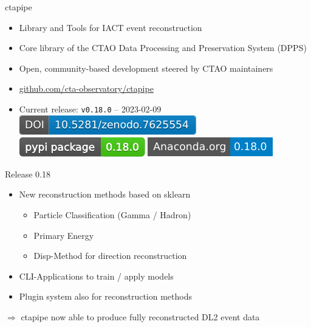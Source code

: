 \documentclass[aspectratio=1610, 9pt]{beamer}
\begin{document}
\begin{frame}{ctapipe}
  \begin{itemize}
    \item Library and Tools for IACT event reconstruction
    \item Core library of the CTAO Data Processing and Preservation System (DPPS)
    \item Open, community-based development steered by CTAO maintainers
    \item \href{https://github.com/cta-observatory/ctapipe}{github.com/cta-observatory/ctapipe}
    \item Current release: \texttt{v0.18.0} – 2023-02-09
      \href{https://doi.org/10.5281/zenodo.3372210}{\includegraphics[height=2ex]{images/ctapipe_zenodo.pdf}}
      \href{https://pypi.org/project/ctapipe}{\includegraphics[height=2ex]{images/ctapipe_pypi.pdf}}
      \href{https://anaconda.org/conda-forge/ctapipe}{\includegraphics[height=2ex]{images/ctapipe_conda.pdf}}
  \end{itemize}
\end{frame}

\begin{frame}
  
\end{frame}

\begin{frame}
  
\end{frame}

\begin{frame}{Release 0.18}
  \begin{itemize}
    \item New reconstruction methods based on sklearn
      \begin{itemize}
        \item Particle Classification (Gamma / Hadron)
        \item Primary Energy
        \item Disp-Method for direction reconstruction
      \end{itemize}
    \item CLI-Applications to train / apply models
    \item Plugin system also for reconstruction methods
  \end{itemize}

  \bigskip
  \begin{center}
    \large
    $\Rightarrow$ ctapipe now able to produce fully reconstructed DL2 event data
  \end{center}
\end{frame}
\end{document}
